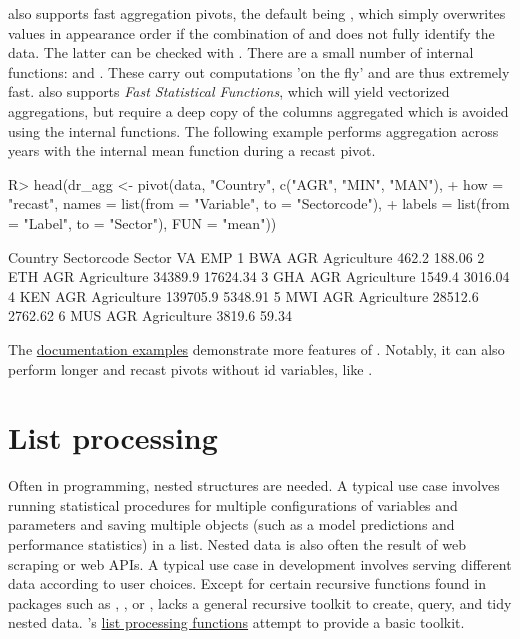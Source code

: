 \documentclass[nojss]{jss} %
\newcommand{\fct}[1]{\code{#1()}}
\begin{document}
\fct{pivot} also supports fast aggregation pivots, the default being , which simply overwrites values in appearance order if the combination of  and  does not fully identify the data. The latter can be checked with . There are a small number of internal functions:  and . These carry out computations 'on the fly' and are thus extremely fast. \fct{pivot} also supports \emph{Fast Statistical Functions}, which will yield vectorized aggregations, but require a deep copy of the columns aggregated which is avoided using the internal functions. The following example performs aggregation across years with the internal mean function during a recast pivot.
\begin{Schunk}
\begin{Sinput}
R> head(dr_agg <- pivot(data, "Country", c("AGR", "MIN", "MAN"),
+    how = "recast", names = list(from = "Variable", to = "Sectorcode"),
+    labels = list(from = "Label", to = "Sector"), FUN = "mean"))
\end{Sinput}
\begin{Soutput}
  Country Sectorcode      Sector       VA      EMP
1     BWA        AGR Agriculture    462.2   188.06
2     ETH        AGR Agriculture  34389.9 17624.34
3     GHA        AGR Agriculture   1549.4  3016.04
4     KEN        AGR Agriculture 139705.9  5348.91
5     MWI        AGR Agriculture  28512.6  2762.62
6     MUS        AGR Agriculture   3819.6    59.34
\end{Soutput}
\end{Schunk}
The \href{https://sebkrantz.github.io/collapse/reference/pivot.html#ref-examples}{documentation examples} demonstrate more features of \fct{pivot}. Notably, it can also perform longer and recast pivots without id variables, like .
%
\section{List processing} \label{sec:list_proc}
%
Often in programming, nested structures are needed. A typical use case involves running statistical procedures for multiple configurations of variables and parameters and saving multiple objects (such as a model predictions and performance statistics) in a list. Nested data is also often the result of web scraping or web APIs. A typical use case in development involves serving different data according to user choices. Except for certain recursive functions found in packages such as , , or ,  lacks a general recursive toolkit to create, query, and tidy nested data. 's \href{https://sebkrantz.github.io/collapse/reference/list-processing.html}{list processing functions} attempt to provide a basic toolkit. \newline
\end{document}
